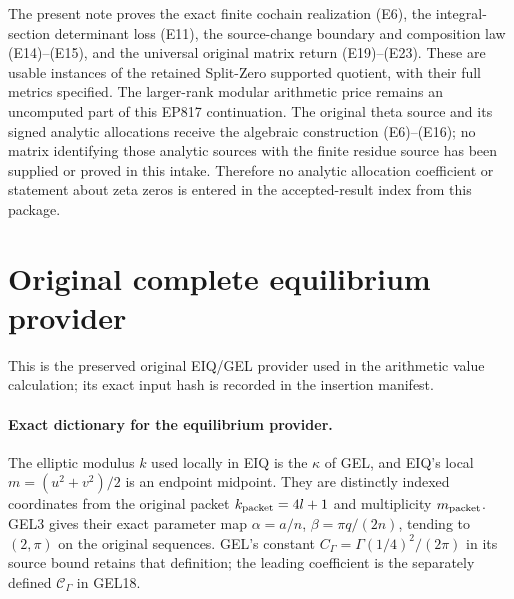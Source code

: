 \documentclass[11pt,a4paper]{article}
\begin{document}
The present note proves the exact finite cochain realization (E6),
the integral-section determinant loss (E11), the source-change
boundary and composition law (E14)--(E15), and the universal original
matrix return (E19)--(E23).  These are usable instances of the retained
Split-Zero supported quotient, with their full metrics specified.
The larger-rank modular arithmetic price remains an uncomputed part
of this EP817 continuation.  The original theta source and its signed
analytic allocations receive the algebraic construction (E6)--(E16);
no matrix identifying those analytic sources with the finite residue
source has been supplied or proved in this intake.  Therefore no
analytic allocation coefficient or statement about zeta zeros is
entered in the accepted-result index from this package.



\endgroup

\clearpage
\begingroup


\setcounter{equation}{0}
\renewcommand{\theequation}{EIQ.\arabic{equation}}
\section*{Original complete equilibrium provider}
This is the preserved original EIQ/GEL provider used in the arithmetic value calculation; its exact input hash is recorded in the insertion manifest.

\paragraph{Exact dictionary for the equilibrium provider.}
The elliptic modulus $k$ used locally in EIQ is the $\kappa$ of GEL,
and EIQ's local $m=(u^2+v^2)/2$ is an endpoint midpoint. They are
distinctly indexed coordinates from the original packet
$k_{\rm packet}=4l+1$ and multiplicity $m_{\rm packet}$.
GEL3 gives their exact parameter map
$\alpha=a/n$, $\beta=\pi q/(2n)$, tending to $(2,\pi)$ on
the original sequences. GEL's constant $C_\Gamma=\Gamma(1/4)^2/(2\pi)$
in its source bound retains that definition; the leading coefficient
is the separately defined $\mathcal C_\Gamma$ in GEL18.

\end{document}
